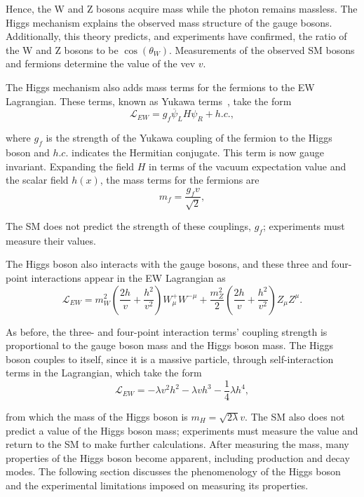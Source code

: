 Hence, the W and Z bosons acquire mass while the photon remains massless. The Higgs mechanism explains the observed mass structure of the gauge bosons. Additionally, this theory predicts, and experiments have confirmed, the ratio of the W and Z bosons to be $\cos(\theta_W)$. Measurements of the observed SM bosons and fermions determine the value of the vev $v$. 

The Higgs mechanism also adds mass terms for the fermions to the EW Lagrangian. These terms, known as Yukawa terms~\cite{weinberg}, take the form
\begin{equation}
    \mathcal{L}_{EW} = g_f \overline{\psi}_L H \psi_R + h.c.,
\end{equation}

\noindent where $g_f$ is the strength of the Yukawa coupling of the fermion to the Higgs boson and $h.c.$ indicates the Hermitian conjugate. This term is now gauge invariant. Expanding the field $H$ in terms of the vacuum expectation value and the scalar field $h(x)$, the mass terms for the fermions are
\begin{equation}
    m_f = \frac{g_f v}{\sqrt{2}},
\end{equation}

The SM does not predict the strength of these couplings, $g_f$; experiments must measure their values.

The Higgs boson also interacts with the gauge bosons, and these three and four-point interactions appear in the EW Lagrangian as
\begin{equation}
    \mathcal{L}_{EW} = m^2_W \left( \frac{2h}{v} + \frac{h^2}{v^2} \right) W_{\mu}^+W^{-\mu} + \frac{m_Z^2}{2}\left( \frac{2h}{v} + \frac{h^2}{v^2} \right)Z_{\mu}Z^{\mu}.
\end{equation}

As before, the three- and four-point interaction terms' coupling strength is proportional to the gauge boson mass and the Higgs boson mass. The Higgs boson couples to itself, since it is a massive particle, through self-interaction terms in the Lagrangian, which take the form
\begin{equation}
    \mathcal{L}_{EW} = -\lambda v^2 h^2 - \lambda v h^3 - \frac{1}{4} \lambda h^4,
\end{equation}

\noindent from which the mass of the Higgs boson is $m_H = \sqrt{2\lambda}v$. The SM also does not predict a value of the Higgs boson mass; experiments must measure the value and return to the SM to make further calculations. After measuring the mass, many properties of the Higgs boson become apparent, including production and decay modes. The following section discusses the phenomenology of the Higgs boson and the experimental limitations imposed on measuring its properties.


